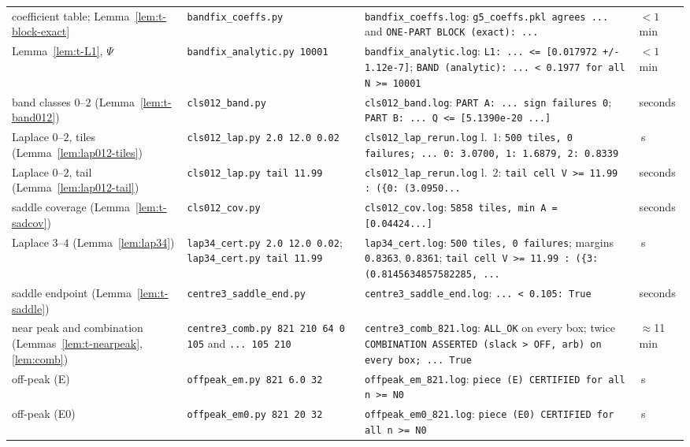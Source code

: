 \begin{center}
\begin{longtable}{@{}>{\raggedright\arraybackslash}p{}>{\raggedright\arraybackslash}p{}>{\raggedright\arraybackslash}p{}>{\raggedright\arraybackslash}p{}@{}}
coefficient table; Lemma~\ref{lem:t-block-exact} & \texttt{bandfix\_coeffs.py} & \texttt{bandfix\_coeffs.log}: \texttt{g5\_coeffs.pkl agrees ...} and \texttt{ONE-PART BLOCK (exact): ...} & $<1$\,min\\
Lemma~\ref{lem:t-L1}, $\Psi$ & \texttt{bandfix\_analytic.py 10001} & \texttt{bandfix\_analytic.log}: \texttt{L1: ... <= [0.017972 +/- 1.12e-7]}; \texttt{BAND (analytic): ... < 0.1977 for all N >= 10001} & $<1$\,min\\
band classes $0$--$2$ (Lemma~\ref{lem:t-band012}) & \texttt{cls012\_band.py} & \texttt{cls012\_band.log}: \texttt{PART A: ... sign failures 0}; \texttt{PART B: ... Q <= [5.1390e-20 ...]} & seconds\\
Laplace $0$--$2$, tiles (Lemma~\ref{lem:lap012-tiles}) & \texttt{cls012\_lap.py 2.0 12.0 0.02} & \texttt{cls012\_lap\_rerun.log} l.~1: \texttt{500 tiles, 0 failures; ... 0: 3.0700, 1: 1.6879, 2: 0.8339} & 8\,s\\
Laplace $0$--$2$, tail (Lemma~\ref{lem:lap012-tail}) & \texttt{cls012\_lap.py tail 11.99} & \texttt{cls012\_lap\_rerun.log} l.~2: \texttt{tail cell V >= 11.99 : (\{0: (3.0950...} & seconds\\
saddle coverage (Lemma~\ref{lem:t-sadcov}) & \texttt{cls012\_cov.py} & \texttt{cls012\_cov.log}: \texttt{5858 tiles, min A = [0.04424...]} & seconds\\
Laplace $3$--$4$ (Lemma~\ref{lem:lap34}) & \texttt{lap34\_cert.py 2.0 12.0 0.02}; \texttt{lap34\_cert.py tail 11.99} & \texttt{lap34\_cert.log}: \texttt{500 tiles, 0 failures}; margins \texttt{0.8363}, \texttt{0.8361}; \texttt{tail cell V >= 11.99 : (\{3: (0.8145634857582285, ...} & 76\,s\\
saddle endpoint (Lemma~\ref{lem:t-saddle}) & \texttt{centre3\_saddle\_end.py} & \texttt{centre3\_saddle\_end.log}: \texttt{... < 0.105: True} & seconds\\
near peak and combination (Lemmas~\ref{lem:t-nearpeak}, \ref{lem:comb}) & \texttt{centre3\_comb.py 821 210 64 0 105} and \texttt{... 105 210} & \texttt{centre3\_comb\_821.log}: \texttt{ALL\_OK} on every box; twice \texttt{COMBINATION ASSERTED (slack > OFF, arb) on every box; ... True} & $\approx$11\,min\\
off-peak (E) & \texttt{offpeak\_em.py 821 6.0 32} & \texttt{offpeak\_em\_821.log}: \texttt{piece (E) CERTIFIED for all n >= N0} & 57\,s\\
off-peak (E0) & \texttt{offpeak\_em0.py 821 20 32} & \texttt{offpeak\_em0\_821.log}: \texttt{piece (E0) CERTIFIED for all n >= N0} & 6\,s\\

\end{longtable}
\end{center}
